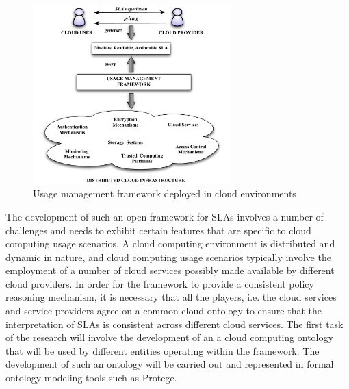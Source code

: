 \documentclass[10pt, conference, compsoc]{IEEEtran}
\begin{document}
\begin{figure}[!t]
\centering
\includegraphics[width=3in]{cloud-umf.pdf}
\caption{Usage management framework deployed in cloud environments}
\label{fig:cloud-umf}
\end{figure}

The development of such an open framework for SLAs involves a number of challenges and needs to exhibit certain features that are specific to cloud computing usage scenarios. A cloud computing environment is distributed and dynamic in nature, and cloud computing usage scenarios typically involve the employment of a number of cloud services possibly made available by different cloud providers. In order for the framework to provide a consistent policy reasoning mechanism, it is necessary that all the players, i.e. the cloud services and service providers agree on a common cloud ontology to ensure that the interpretation of SLAs is consistent across different cloud services. The first task of the research will involve the development of an a cloud computing ontology that will be used by different entities operating within the framework. The development of such an ontology will be carried out and represented in formal ontology modeling tools such as Protege. 
\end{document}
